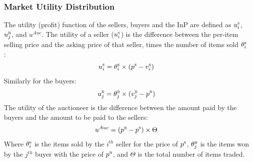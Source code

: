 \subsubsection{Market Utility Distribution}
The utility (profit) function of the sellers, buyers and the \ac{InP} are defined as $u_{i}^\textsc{s}$, $u_{j}^\textsc{b}$, and $u^{Auc}$.
The utility of a seller ($u_{i}^\textsc{s}$) is the difference between the per-item selling price and the asking price of that seller, times the number of items sold $\theta_{i}^\textsc{s}$:
\begin{equation}
\vspace{-1mm}
\label{seller_utility_formula}
u_{i}^\textsc{s} = {\theta_{i}^\textsc{s}}  \times (p^\textsc{s} - {v_{i}^\textsc{s}})
\end{equation}
Similarly for the buyers:
\begin{equation}
\vspace{-1mm}
\label{buyer_utility_formula}
u_{j}^\textsc{b} = {\theta_{j}^\textsc{b}}  \times ({v_{j}^\textsc{b}}-p^\textsc{b})
\end{equation}
The utility of the auctioneer is the difference between the amount paid by the buyers and the amount to be paid to the sellers:
\begin{eqnarray}
\vspace{-4mm}
u^{Auc} = (p^\textsc{b} - p^\textsc{s}) \times \Theta
\end{eqnarray}
 Where $\theta_{i}^\textsc{s}$ is the items sold by the $i^{th}$ seller for the price of $p^\textsc{s}$, ${\theta_{j}^\textsc{b}}$ is the items won by the $j^{th}$ buyer with the price of $p^\textsc{b}$, and $\Theta$ is the total number of items traded.

